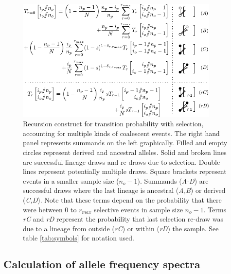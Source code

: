 \documentclass[review]{elsarticle}
\newcommand{\sgcomment}[1]{{\color{red}{SG: #1}}}
\begin{document}
\begin{figure}
  \centering
  \includegraphics[width=0.9\textwidth]{fig/recurrence-selection-dynamic-failures-annotated.pdf}

  \caption{Recursion construct for transition probability with selection, accounting for multiple
    kinds of coalescent events. The right hand panel represents summands on the left graphically.
    Filled and empty circles represent derived and ancestral alleles. Solid and broken lines are
    successful lineage draws and re-draws due to selection. Double lines represent potentially
    multiple draws. Square brackets represent events in a smaller sample size ($n_o-1$). Summands
    (\textit{A-D}) are successful draws where the last lineage is ancestral (\textit{A,B}) or
    derived (\textit{C,D}). Note that these terms depend on the probability that there were between
    $0$ to $r_{max}$ selective events in sample size $n_o-1$. Terms \textit{rC} and \textit{rD}
    represent the probability that last selection re-draw was due to a lineage from outside
    (\textit{rC}) or within (\textit{rD}) the sample. See table \ref{tab:symbols} for notation used.
  }

  \label{fig:rec-selection-dynamic-fail}
\end{figure}
 

\subsection{Calculation of allele frequency spectra}
\label{subsec:afs}
\end{document}
